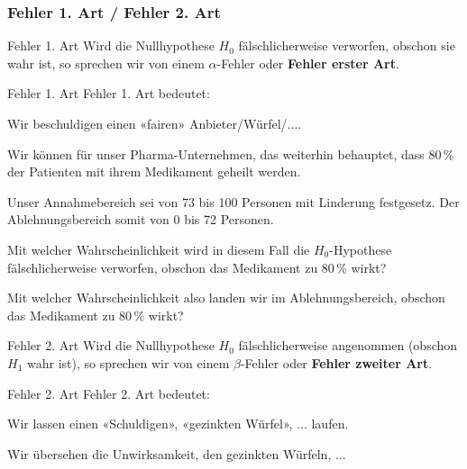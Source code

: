 
\subsubsection{Fehler 1. Art / Fehler 2. Art}

\begin{definition}{Fehler 1. Art}{}
  Wird die Nullhypothese $H_0$ fälschlicherweise verworfen, obschon
  sie wahr ist, so sprechen wir von einem $\alpha$-Fehler oder \textbf{Fehler erster Art}.
\end{definition}

\begin{bemerkung}{Fehler 1. Art}{}
  Fehler 1. Art bedeutet:

  Wir beschuldigen einen «fairen» Anbieter/Würfel/....
  \end{bemerkung}

Wir können für unser Pharma-Unternehmen, das weiterhin behauptet, dass
80\,\% der Patienten mit ihrem Medikament geheilt werden.

Unser Annahmebereich sei von 73 bis 100 Personen mit Linderung
festgesetz. Der Ablehnungsbereich somit von 0 bis 72 Personen.

Mit welcher Wahrscheinlichkeit wird in diesem Fall die $H_0$-Hypothese
fälschlicherweise verworfen, obschon das Medikament zu 80\,\% wirkt?

Mit welcher Wahrscheinlichkeit also landen wir im Ablehnungsbereich,
obschon das Medikament zu 80\,\% wirkt?


\begin{definition}{Fehler 2. Art}{}
  Wird die Nullhypothese $H_0$ fälschlicherweise angenommen (obschon
  $H_1$ wahr ist), so
  sprechen wir von einem $\beta$-Fehler oder \textbf{Fehler zweiter Art}.
\end{definition}
\begin{bemerkung}{Fehler 2. Art}{}
  Fehler 2. Art bedeutet:

  Wir lassen einen «Schuldigen», «gezinkten Würfel», ... laufen.

  Wir übersehen die Unwirksamkeit, den gezinkten Würfeln, ...
\end{bemerkung}


